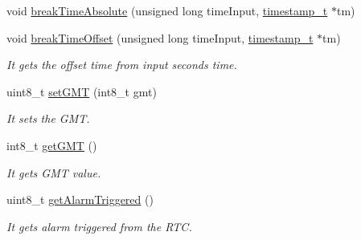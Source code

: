 \begin{DoxyCompactItemize}
void \hyperlink{class_wasp_r_t_c_a9d24c3b1008e7832d3a1b28e17510d73}{break\+Time\+Absolute} (unsigned long time\+Input, \hyperlink{structtimestamp__t}{timestamp\+\_\+t} $\ast$tm)
\item 
void \hyperlink{class_wasp_r_t_c_a412d547f7c3b807ac0dfc67d984939ea}{break\+Time\+Offset} (unsigned long time\+Input, \hyperlink{structtimestamp__t}{timestamp\+\_\+t} $\ast$tm)
\begin{DoxyCompactList}\small\item\em It gets the offset time from input seconds time. \end{DoxyCompactList}\item 
uint8\+\_\+t \hyperlink{class_wasp_r_t_c_a8c8ba5c6a96fbafb02007ddfd7d51cba}{set\+G\+MT} (int8\+\_\+t gmt)
\begin{DoxyCompactList}\small\item\em It sets the G\+MT. \end{DoxyCompactList}\item 
int8\+\_\+t \hyperlink{class_wasp_r_t_c_a1336f95a263851ae2a0f7c20be12f4c9}{get\+G\+MT} ()
\begin{DoxyCompactList}\small\item\em It gets G\+MT value. \end{DoxyCompactList}\item 
uint8\+\_\+t \hyperlink{class_wasp_r_t_c_a673e05184e7bb06fb1205d3f90e8d564}{get\+Alarm\+Triggered} ()
\begin{DoxyCompactList}\small\item\em It gets alarm triggered from the R\+TC. \end{DoxyCompactList}\end{DoxyCompactItemize}
